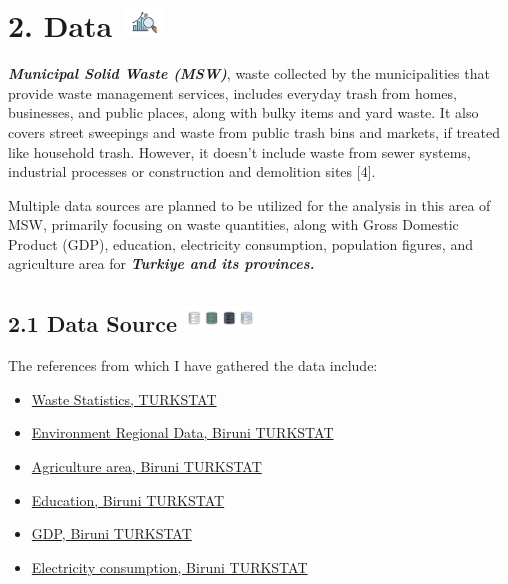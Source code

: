 \documentclass[
  11pt,
  a4paper,
  DIV=11,
  numbers=noendperiod]{scrartcl}
\providecommand{\tightlist}{%
  \setlength{\itemsep}{0pt}\setlength{\parskip}{0pt}}\usepackage{longtable,booktabs,array}
\begin{document}
\section[{2. Data} ]{\texorpdfstring{{2. Data}
\protect\includegraphics[width=0.44792in,height=0.30208in]{assets/images/data_symbol.jpg}}{2. Data }}\label{data}

{\textbf{\emph{Municipal Solid Waste (MSW)}}}, waste collected by the
municipalities that provide waste management services, includes everyday
trash from homes, businesses, and public places, along with bulky items
and yard waste. It also covers street sweepings and waste from public
trash bins and markets, if treated like household trash. However, it
doesn't include waste from sewer systems, industrial processes or
construction and demolition sites {[}4{]}.

Multiple data sources are planned to be utilized for the analysis in
this area of MSW, primarily focusing on waste quantities, along with
Gross Domestic Product (GDP), education, electricity consumption,
population figures, and agriculture area for \textbf{\emph{Turkiye and
its provinces.}}

\subsection[{2.1 Data Source} ]{\texorpdfstring{{2.1 Data Source}
\protect\includegraphics[width=0.73958in,height=0.30208in]{assets/images/database.jpg}}{2.1 Data Source }}\label{data-source}

The references from which I have gathered the data include:

\begin{itemize}
\tightlist
\item
  \href{https://data.tuik.gov.tr/Bulten/Index?p=Waste-Statistics-2022-49570}{Waste
  Statistics, TURKSTAT}
\item
  \href{https://biruni.tuik.gov.tr/bolgeselistatistik/}{Environment
  Regional Data, Biruni TURKSTAT}
\item
  \href{https://biruni.tuik.gov.tr/bolgeselistatistik/}{Agriculture
  area, Biruni TURKSTAT}
\item
  \href{https://biruni.tuik.gov.tr/bolgeselistatistik/}{Education,
  Biruni TURKSTAT}
\item
  \href{https://biruni.tuik.gov.tr/bolgeselistatistik/}{GDP, Biruni
  TURKSTAT}
\item
  \href{https://biruni.tuik.gov.tr/bolgeselistatistik/}{Electricity
  consumption, Biruni TURKSTAT}
\end{itemize}
\end{document}
